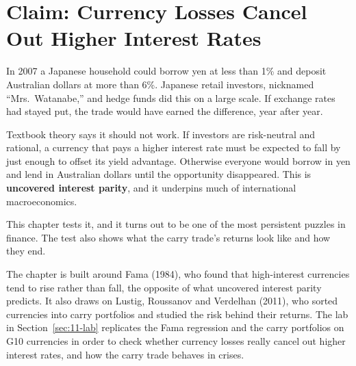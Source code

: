 \makeatletter
{}
\makeatother

\chapter{Claim: Currency Losses Cancel Out Higher Interest Rates}
\label{ch:11}

In 2007 a Japanese household could borrow yen at less than 1\% and deposit Australian dollars at more than 6\%. Japanese retail investors, nicknamed ``Mrs.\ Watanabe,'' and hedge funds did this on a large scale. If exchange rates had stayed put, the trade would have earned the difference, year after year.

Textbook theory says it should not work. If investors are risk-neutral and rational, a currency that pays a higher interest rate must be expected to fall by just enough to offset its yield advantage. Otherwise everyone would borrow in yen and lend in Australian dollars until the opportunity disappeared. This is \textbf{uncovered interest parity}, and it underpins much of international macroeconomics.

This chapter tests it, and it turns out to be one of the most persistent puzzles in finance. The test also shows what the carry trade's returns look like and how they end.

The chapter is built around Fama (1984), who found that high-interest currencies tend to rise rather than fall, the opposite of what uncovered interest parity predicts. It also draws on Lustig, Roussanov and Verdelhan (2011), who sorted currencies into carry portfolios and studied the risk behind their returns. The lab in Section~\ref{sec:11-lab} replicates the Fama regression and the carry portfolios on G10 currencies in order to check whether currency losses really cancel out higher interest rates, and how the carry trade behaves in crises.

